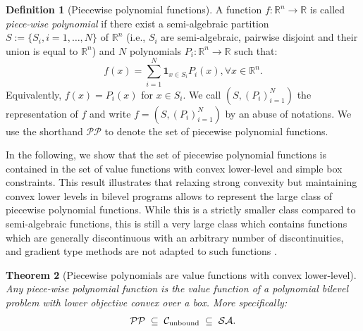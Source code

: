 \documentclass{article}
\newcommand{\mbf}[1]{\mathbf{#1}}
\newcommand*{\cC}{\mathcal{C}}
\newcommand*{\RR}{\mathbb{R}}
\newcommand{\tupfuncN}{(P_i)_{i = 1}^N}
\newcommand{\SA}{\mathcal{SA}}
\newcommand{\PP}{\mathcal{PP}}
\newcommand{\unbounded}{\text{unbound}}
\theoremstyle{plain}
\newtheorem{theorem}{Theorem}[section]
\theoremstyle{definition}
\newtheorem{definition}[theorem]{Definition}
\begin{document}
\begin{definition}[Piecewise polynomial functions]
    \label{def:piecewise-polynomial}
     A function $f: \RR^n \to \RR$ is called \emph{piece-wise polynomial} if there exist a semi-algebraic partition $S:= \{S_i, i = 1, \ldots, N\}$ of $\RR^n$ (i.e., $S_i$ are semi-algebraic, pairwise disjoint and their union is equal to $\RR^n$) and $N$ polynomials $P_i: \RR^n \to \RR$ such that:
    \begin{equation*}
        f(x) = \sum_{i=1}^N \mbf{1}_{x \in S_i}P_i(x), \forall x \in \RR^n.
    \end{equation*}
    Equivalently, $f(x) = P_i(x)$ for $x \in S_i$. We call $(S, \tupfuncN)$ the representation of $f$ and write $f = (S, \tupfuncN)$ by an abuse of notations. We use the shorthand $\PP$ to denote the set of piecewise polynomial functions.
\end{definition}


In the following, we show that the set of piecewise polynomial functions is contained in the set of value functions with convex lower-level and simple box constraints. This result illustrates that relaxing strong convexity but maintaining convex lower levels in bilevel programs allows to represent the large class of piecewise polynomial functions. While this is a strictly smaller class compared to semi-algebraic functions, this is still a very large class which contains functions which are generally discontinuous with an arbitrary number of discontinuities, and gradient type methods are not adapted to such functions \cite{bolte2021implicitdifferentiation}. 

\begin{theorem}[Piecewise polynomials are value functions with convex lower-level]
    \label{theorem:convex-closed-bilevel-class}
    Any piece-wise polynomial function is the value function of a polynomial bilevel problem with lower objective convex over a box. More specifically:
    \begin{equation*}
        \begin{aligned}
            \PP \; \subseteq \; \cC_{\textup{\unbounded}} \; \subseteq \; \SA.
        \end{aligned}
    \end{equation*}
\end{theorem}
\end{document}
